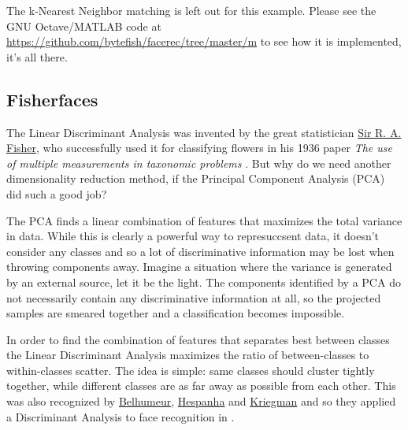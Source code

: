 The k-Nearest Neighbor matching is left out for this example. Please see the GNU Octave/MATLAB code at \url{https://github.com/bytefish/facerec/tree/master/m} to see how it is implemented, it's all there.

\subsection{Fisherfaces}

\label{ssection:fisherfaces}

The Linear Discriminant Analysis was invented by the great statistician \href{http://en.wikipedia.org/wiki/Ronald_Fisher}{Sir R. A. Fisher}, who successfully used it for classifying flowers in his 1936 paper \textit{The use of multiple measurements in taxonomic problems} \cite{Fisher36}. But why do we need another dimensionality reduction method, if the Principal Component Analysis (PCA) did such a good job? 

The PCA finds a linear combination of features that maximizes the total variance in data. While this is clearly a powerful way to represuccsent data, it doesn't consider any classes and so a lot of discriminative information may be lost when throwing components away. Imagine a situation where the variance is generated by an external source, let it be the light. The components identified by a PCA do not necessarily contain any discriminative information at all, so the projected samples are smeared together and a classification becomes impossible.

In order to find the combination of features that separates best between classes the Linear Discriminant Analysis maximizes the ratio of between-classes to within-classes scatter. The idea is simple: same classes should cluster tightly together, while different classes are as far away as possible from each other. This was also recognized by \href{http://www.cs.columbia.edu/~belhumeur/}{Belhumeur}, \href{http://www.ece.ucsb.edu/~hespanha/}{Hespanha} and \href{http://cseweb.ucsd.edu/~kriegman/}{Kriegman} and so they applied a Discriminant Analysis to face recognition in \cite{belhumeru97}. 


